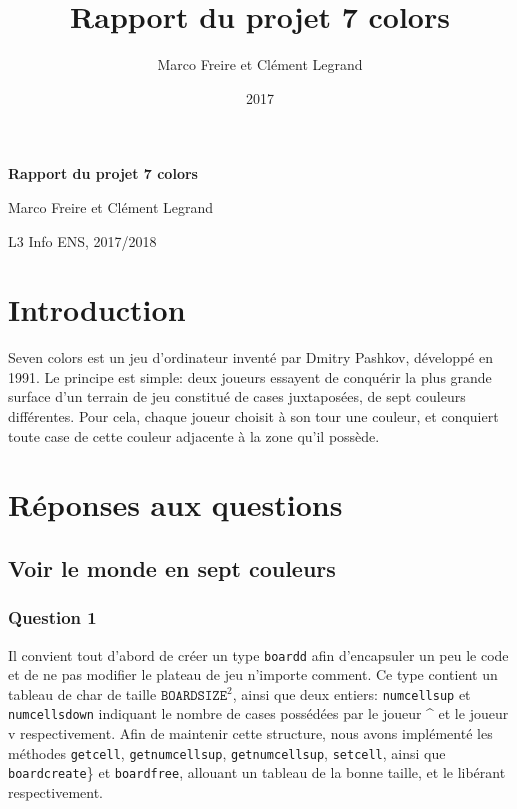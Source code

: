 \documentclass[12pt,a4paper,twoside]{article}
\author{Marco Freire et Clément Legrand}
\date{2017}
\title{Rapport du projet 7 colors}
\let\oldmaketitle=\maketitle
\def\maketitle{}
\begin{document}
\maketitle
\renewcommand{\v}[1]{\ensuremath{\overrightarrow{#1}}\xspace}
\let\oldcite=\cite
\def\cite#1{~\oldcite{#1}\xspace}
\let\oldref=\ref
\def\ref#1{~\oldref{#1}\xspace}
\let\oldeqref=\eqref
\def\eqref#1{~\oldeqref{#1}\xspace}
\let\leq=\leqslant
\let\geq=\geqslant
\let\le=\leqslant
\let\ge=\geqslant
\def\R{\ensuremath{\mathbb{R}}\xspace}
\pagestyle{empty} 
\let\maketitle=\oldmaketitle

\pagestyle{fancy}
\fancyhead{}
\fancyfoot{}
\lhead[\thepage]{\sffamily\itshape \leftmark}

\begin{center}
\bgroup\bf \LARGE Rapport du projet 7 colors\egroup\medskip

\large Marco Freire et Clément Legrand \smallskip

\normalsize L3 Info ENS, 2017/2018
\end{center}

\section{Introduction}
\label{sec:orgheadline1}
Seven colors est un jeu d'ordinateur inventé par Dmitry Pashkov,
développé en 1991. Le principe est simple: deux joueurs essayent de
conquérir la plus grande surface d'un terrain de jeu constitué de
cases juxtaposées, de sept couleurs différentes. Pour cela, chaque
joueur choisit à son tour une couleur, et conquiert toute case de
cette couleur adjacente à la zone qu'il possède.

\section{Réponses aux questions}
\label{sec:orgheadline25}
\subsection{Voir le monde en sept couleurs}
\label{sec:orgheadline9}
\subsubsection*{Question 1}
\label{sec:orgheadline2}
Il convient tout d'abord de créer un type \texttt{boardd} afin
d'encapsuler un peu le code et de ne pas modifier le plateau de jeu
n'importe comment. Ce type contient un tableau de char de taille
\(\texttt{BOARDSIZE} ^{2}\), ainsi que deux entiers:
\texttt{numcellsup} et \texttt{numcellsdown} indiquant le nombre de
cases possédées par le joueur \^{} et le joueur v respectivement.
Afin de maintenir cette structure, nous avons implémenté les
méthodes \texttt{getcell}, \texttt{getnumcellsup},
\texttt{getnumcellsup}, \texttt{setcell}, ainsi que
\texttt{boardcreate}\} et \texttt{boardfree}, allouant un tableau de
la bonne taille, et le libérant respectivement. 
\end{document}
